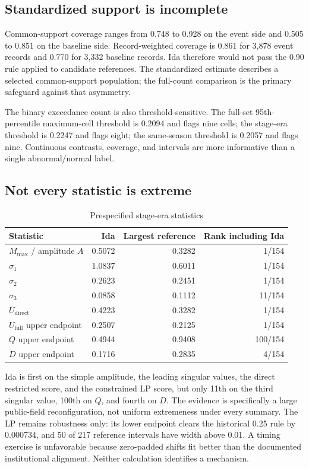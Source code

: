 \documentclass[11pt]{article}
\begin{document}
\subsection{Standardized support is incomplete}

Common-support coverage ranges from 0.748 to 0.928 on the event side and 0.505 to 0.851 on the baseline side. Record-weighted coverage is 0.861 for 3,878 event records and 0.770 for 3,332 baseline records. Ida therefore would not pass the 0.90 rule applied to candidate references. The standardized estimate describes a selected common-support population; the full-count comparison is the primary safeguard against that asymmetry.

The binary exceedance count is also threshold-sensitive. The full-set 95th-percentile maximum-cell threshold is 0.2094 and flags nine cells; the stage-era threshold is 0.2247 and flags eight; the same-season threshold is 0.2057 and flags nine. Continuous contrasts, coverage, and intervals are more informative than a single abnormal/normal label.

\subsection{Not every statistic is extreme}

\begin{table}[t]
\centering
\caption{Prespecified stage-era statistics}
\label{tab:secondary}
\begin{tabular}{@{}lrrr@{}}
\toprule
Statistic & Ida & Largest reference & Rank including Ida \\
\midrule
$M_{\max}$ / amplitude $A$ & 0.5072 & 0.3282 & 1/154 \\
$\sigma_1$ & 1.0837 & 0.6011 & 1/154 \\
$\sigma_2$ & 0.2623 & 0.2451 & 1/154 \\
$\sigma_3$ & 0.0858 & 0.1112 & 11/154 \\
$U_{\mathrm{direct}}$ & 0.4223 & 0.3282 & 1/154 \\
$U_{\mathrm{full}}$ upper endpoint & 0.2507 & 0.2125 & 1/154 \\
$Q$ upper endpoint & 0.4944 & 0.9408 & 100/154 \\
$D$ upper endpoint & 0.1716 & 0.2835 & 4/154 \\
\bottomrule
\end{tabular}
\end{table}

Ida is first on the simple amplitude, the leading singular values, the direct restricted score, and the constrained LP score, but only 11th on the third singular value, 100th on $Q$, and fourth on $D$. The evidence is specifically a large public-field reconfiguration, not uniform extremeness under every summary. The LP remains robustness only: its lower endpoint clears the historical 0.25 rule by 0.000734, and 50 of 217 reference intervals have width above 0.01. A timing exercise is unfavorable because zero-padded shifts fit better than the documented institutional alignment. Neither calculation identifies a mechanism.
\end{document}

